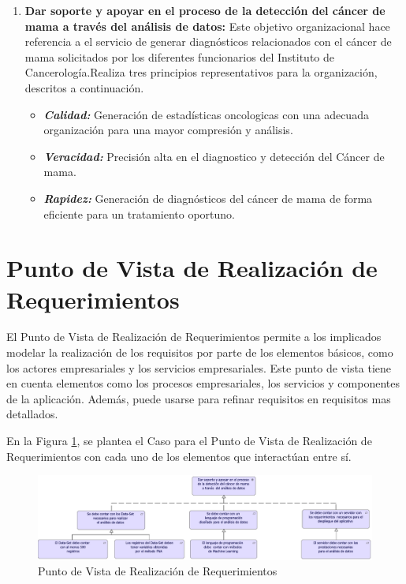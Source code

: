 \begin{enumerate}[label=\textbf{\arabic*})]
	\item  \textbf{Dar soporte y apoyar en el proceso de la detección del cáncer de mama a través del análisis de datos:} Este objetivo organizacional hace referencia a el servicio de generar diagnósticos relacionados con el cáncer de mama  solicitados por los diferentes funcionarios del Instituto de Cancerología.Realiza tres principios representativos para la organización, descritos a continuación.
	
	\begin{itemize}
		\item  \textbf{\textit{Calidad:}} Generación de estadísticas oncologicas con una adecuada organización para una mayor compresión y análisis.
		
		\item  \textbf{\textit{Veracidad:}} Precisión  alta en el diagnostico y detección del Cáncer de mama.
		
		\item  \textbf{\textit{Rapidez:}}  Generación de diagnósticos del cáncer de mama de forma eficiente para un tratamiento oportuno.
	\end{itemize}
\end{enumerate}

\newpage
\section{Punto de Vista de Realización de Requerimientos }

El Punto de Vista de Realización de Requerimientos permite a los implicados modelar la realización de los requisitos por parte de los elementos básicos, como los actores empresariales y los servicios empresariales. Este punto de vista tiene en cuenta elementos como los procesos empresariales, los servicios y componentes de la aplicación. Además, puede usarse para refinar requisitos en requisitos mas detallados\cite{BolanosCastro2019}. 

En la Figura \ref{PvRealizacionReq}, se plantea el Caso para el Punto de Vista de Realización de Requerimientos con cada uno de los elementos que interactúan entre sí. 

\begin{figure}[h!]
	\centering
	\includegraphics[width=1\linewidth]{ARQUITECTURA/imgs/CapaMotivacion/5_PvRealizacionReq}
	\caption{Punto de Vista de Realización de Requerimientos}
	\label{PvRealizacionReq}
\end{figure}

